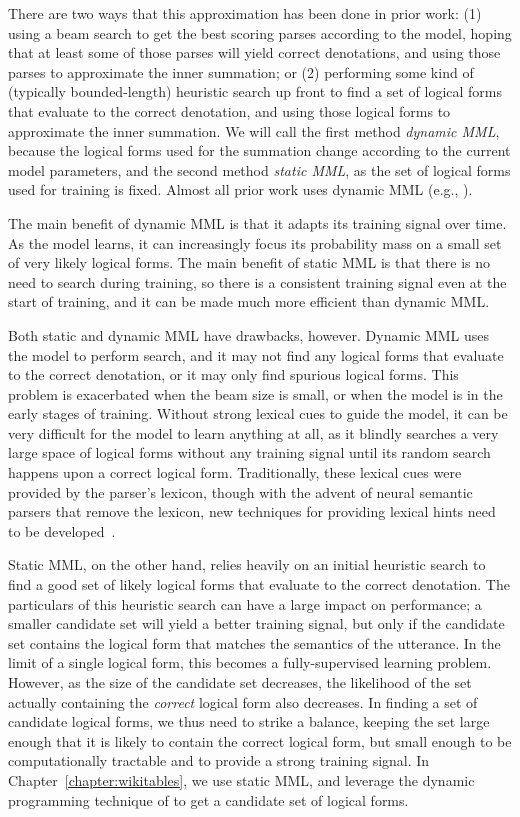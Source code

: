 There are two ways that this approximation has been done in prior work: (1)
using a beam search to get the best scoring parses according to the model,
hoping that at least some of those parses will yield correct denotations, and
using those parses to approximate the inner summation; or (2) performing some
kind of (typically bounded-length) heuristic search up front to find a set of
logical forms that evaluate to the correct denotation, and using those logical
forms to approximate the inner summation.  We will call the first method
\emph{dynamic MML}, because the logical forms used for the summation change
according to the current model parameters, and the second method \emph{static
MML}, as the set of logical forms used for training is fixed.  Almost all prior
work uses dynamic MML (e.g.,
\citet{liang2011learning,berant2013semantic,goldman2017weakly}).

The main benefit of dynamic MML is that it adapts its training signal over
time.  As the model learns, it can increasingly focus its probability mass on a
small set of very likely logical forms.  The main benefit of static MML is that
there is no need to search during training, so there is a consistent training
signal even at the start of training, and it can be made much more efficient
than dynamic MML\@.

Both static and dynamic MML have drawbacks, however.  Dynamic MML uses the
model to perform search, and it may not find any logical forms that evaluate to
the correct denotation, or it may only find spurious logical forms.  This
problem is exacerbated when the beam size is small, or when the model is in the
early stages of training.  Without strong lexical cues to guide the model, it
can be very difficult for the model to learn anything at all, as it blindly
searches a very large space of logical forms without any training signal until
its random search happens upon a correct logical form.  Traditionally, these
lexical cues were provided by the parser's lexicon, though with the advent of
neural semantic parsers that remove the lexicon, new techniques for providing
lexical hints need to be developed~\citep{goldman2017weakly}.

Static MML, on the other hand, relies heavily on an initial heuristic search to
find a good set of likely logical forms that evaluate to the correct
denotation.  The particulars of this heuristic search can have a large impact
on performance; a smaller candidate set will yield a better training signal,
but only if the candidate set contains the logical form that matches the
semantics of the utterance.  In the limit of a single logical form, this
becomes a fully-supervised learning problem.  However, as the size of the
candidate set decreases, the likelihood of the set actually containing the
\emph{correct} logical form also decreases.  In finding a set of candidate
logical forms, we thus need to strike a balance, keeping the set large enough
that it is likely to contain the correct logical form, but small enough to be
computationally tractable and to provide a strong training signal.
In Chapter~\ref{chapter:wikitables}, we use static MML, and leverage the dynamic
programming technique of \citet{pasupat2016inferring} to get a candidate set of logical
forms.

